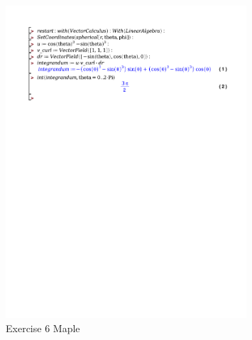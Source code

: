 \documentclass[a4paper]{report}
\begin{document}
\begin{figure}[H]
	\centering
	\includegraphics[width=0.8\textwidth]{exercises/huis_7_ex_6.pdf}
	\caption{Exercise 6 Maple}
	\label{fig:huis_7_ex_6}
\end{figure}
\end{document}
